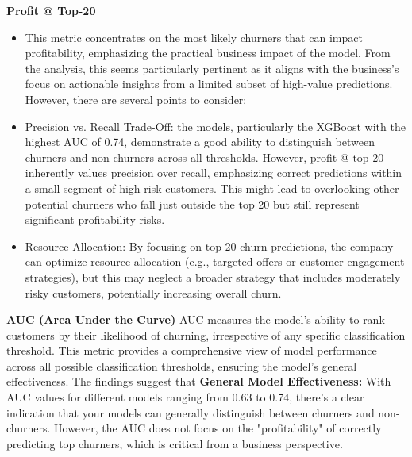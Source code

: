 \documentclass{article}
\begin{document}
\textbf{Profit @ Top-20}
\begin{itemize}

    \item This metric concentrates on the most likely churners that can impact profitability, emphasizing the practical business impact of the model. From the analysis, this seems particularly pertinent as it aligns with the business's focus on actionable insights from a limited subset of high-value predictions. However, there are several points to consider:

    \item  Precision vs. Recall Trade-Off: the models, particularly the XGBoost with the highest AUC of 0.74, demonstrate a good ability to distinguish between churners and non-churners across all thresholds. However, profit @ top-20 inherently values precision over recall, emphasizing correct predictions within a small segment of high-risk customers. This might lead to overlooking other potential churners who fall just outside the top 20 but still represent significant profitability risks.
    
    \item Resource Allocation: By focusing on top-20 churn predictions, the company can optimize resource allocation (e.g., targeted offers or customer engagement strategies), but this may neglect a broader strategy that includes moderately risky customers, potentially increasing overall churn.

\end{itemize}
\textbf{AUC (Area Under the Curve)}
AUC measures the model's ability to rank customers by their likelihood of churning, irrespective of any specific classification threshold. This metric provides a comprehensive view of model performance across all possible classification thresholds, ensuring the model's general effectiveness. The findings suggest that \textbf{General Model Effectiveness:} With AUC values for different models ranging from 0.63 to 0.74, there's a clear indication that your models can generally distinguish between churners and non-churners. However, the AUC does not focus on the "profitability" of correctly predicting top churners, which is critical from a business perspective.
   
\end{document}
